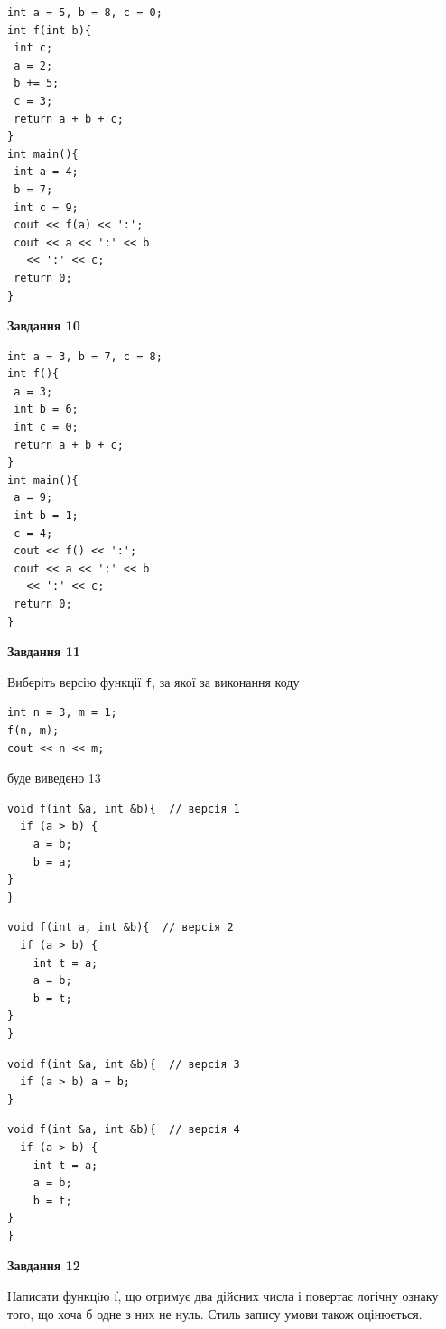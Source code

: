 \documentclass[12pt, ukrainian]{article}
\def\code#1{\Verb!#1!}
\begin{document}
{\begin {large}
\begin{minipage}[t]{7.0cm}
\begin{verbatim}
int a = 5, b = 8, c = 0;
int f(int b){
 int c;
 a = 2;
 b += 5;
 c = 3;
 return a + b + c;
}
int main(){
 int a = 4;
 b = 7;
 int c = 9;
 cout << f(a) << ':';
 cout << a << ':' << b 
   << ':' << c;
 return 0;
}
\end{verbatim}



\begin{center}
\textbf{Завдання 10}
\end{center}
\vspace{-8mm}

\begin{verbatim}
int a = 3, b = 7, c = 8;
int f(){
 a = 3;
 int b = 6;
 int c = 0;
 return a + b + c;
}
int main(){
 a = 9;
 int b = 1;
 c = 4;
 cout << f() << ':';
 cout << a << ':' << b 
   << ':' << c;
 return 0;
}
\end{verbatim}

\end{minipage}
\vline \hspace{1mm}
\begin{minipage}[t]{11.0cm}

\begin{center}
\textbf{Завдання 11}
\end{center}
Виберіть версію функції \code{f}, за якої за виконання коду
\begin{verbatim}
int n = 3, m = 1;
f(n, m);
cout << n << m;
\end{verbatim}

буде виведено 13

\begin{verbatim}
void f(int &a, int &b){  // версія 1
  if (a > b) {
    a = b;
    b = a;
}  
}
\end{verbatim}

\vspace{-8mm}\begin{verbatim}
void f(int a, int &b){  // версія 2
  if (a > b) {
    int t = a;
    a = b;
    b = t;
}  
}
\end{verbatim}

\vspace{-8mm}\begin{verbatim}
void f(int &a, int &b){  // версія 3
  if (a > b) a = b;
}
\end{verbatim}

\vspace{-8mm}\begin{verbatim}
void f(int &a, int &b){  // версія 4
  if (a > b) {
    int t = a;
    a = b;
    b = t;
}  
}
\end{verbatim}



\begin{center}
\textbf{Завдання 12}
\end{center}

Написати функцiю f, що отримує два дійсних числа і повертає логічну ознаку того, що хоча б одне з них не нуль. Стиль запису умови також оцінюється.\par

\end{minipage}

\end {large}}
\end{document}
